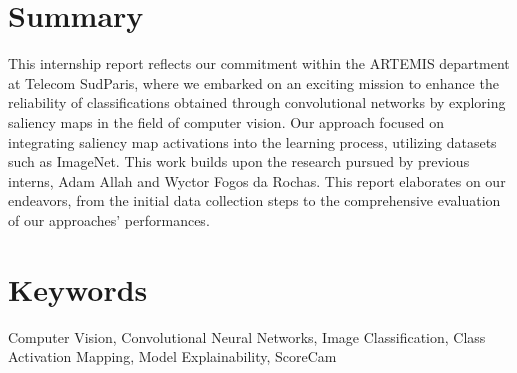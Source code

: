 \documentclass{report}
\begin{document}
{\section*{Summary}
\hspace{1.6cm}This internship report reflects our commitment within the ARTEMIS department at Telecom SudParis, where we embarked on an exciting mission to enhance the reliability of classifications obtained through convolutional networks by exploring saliency maps in the field of computer vision. Our approach focused on integrating saliency map activations into the learning process, utilizing datasets such as ImageNet. This work builds upon the research pursued by previous interns, Adam Allah and Wyctor Fogos da Rochas. This report elaborates on our endeavors, from the initial data collection steps to the comprehensive evaluation of our approaches' performances.

\section*{Keywords}
Computer Vision, Convolutional Neural Networks, Image Classification, Class Activation Mapping, Model Explainability, ScoreCam}
\end{document}
